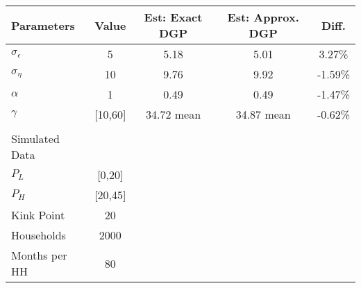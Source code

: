 \begin{tabular}{lcccc}
Parameters & Value & Est: Exact DGP  &  Est: Approx. DGP & Diff.   \\
\hline
$\sigma_{\epsilon}$  &5 &5.18 &5.01 &3.27\%  \\
$\sigma_{\eta}$  &10 &9.76 &9.92 &-1.59\%    \\
$\alpha$  &1 &0.49 &0.49 &-1.47\%    \\
$\gamma$  &[10,60] &34.72 mean &34.87 mean &-0.62\%   \\
 & & & & \\
Simulated Data &    &   &    &   \\
\hline
$P_L$ &[0,20] & & & \\
$P_H$ &[20,45] & & &  \\
Kink Point &20 & & &    \\
Households &2000 & & &    \\
Months per HH &80 & & &   \\
\hline
\end{tabular}
